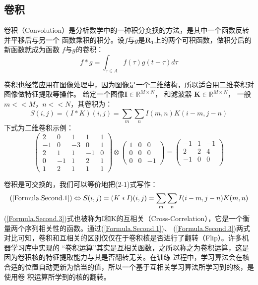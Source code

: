   \subsection{卷积}
  卷积（Convolution）是分析数学中的一种积分变换的方法，是其中一个函数反转并平移后与另一个
  函数乘积的积分。设$f$与$g$是$\mathbf{R_1}$上的两个可积函数，做积分后的新函数就成为函数
  $f$与$g$的卷积：
  \[f*g=\int_{\tau \in A}f(\tau)g(t-\tau) d\tau\]

  卷积也经常应用在图像处理中，因为图像是一个二维结构，所以适合用二维卷积对图像做特征提取等操作。
  给定一个图像$\mathbf{I}\in \mathbb{R}^{M\times N}$，
  和滤波器 $\mathbf{K}\in \mathbb{R}^{M\times N}$，
  一般$m<<M$，$n<<N$，其卷积为：
  \begin{equation}
    S(i,j)=(I*K)(i,j)=\sum_m \sum_n I(m,n)K(i-m,j-n)\label{Formula.Second.1}
  \end{equation}
  下式为二维卷积示例：
  \begin{equation}
    {\begin{pmatrix}
    2& 0& 1& 1& 1 \\
    -1& 0& -3& 0& 1\\
    2& 1& 1& -1& 0 \\
    0& -1& 1& 2& 1 \\
    1& 2& 1& 1& 1
    \end{pmatrix}} 
    \otimes 
    {\begin{pmatrix}
      1& 0& 0\\
      0& 0& 0\\
      0& 0& -1
    \end{pmatrix}}
    =
    {\begin{pmatrix}
      -1& 1& -1\\
      2& 2& 4\\
      -1& 0& 0\\
    \end{pmatrix}}\label{Formula.Second.2}
  \end{equation}

  卷积是可交换的，我们可以等价地把(2-1)式写作：
  \begin{equation}
    (\ref{Formula.Second.1}) \Leftrightarrow S(i,j)=(K*I)(i,j)=\sum_m \sum_n I(i-m,j-n)K(m,n)\label{Formula.Second.3}
  \end{equation}
  (\ref{Formula.Second.3})式也被称为I和K的互相关（Cross-Correlation），它是一个衡量两个序列相关性的函数。通过(\ref{Formula.Second.1})、
  (\ref{Formula.Second.3})两式对比可知，卷积和互相关的区别仅仅在于卷积核是否进行了翻转（Flip）。许多机器学习库中实现的
  “卷积运算”其实是互相关函数，之所以称之为卷积运算，这是因为卷积核的特征提取能力与其是否翻转无关。在训练
  过程中，学习算法会在核合适的位置自动更新为恰当的值，所以一个基于互相关学习算法所学习到的核，是使用卷
  积运算所学到的核的翻转。

